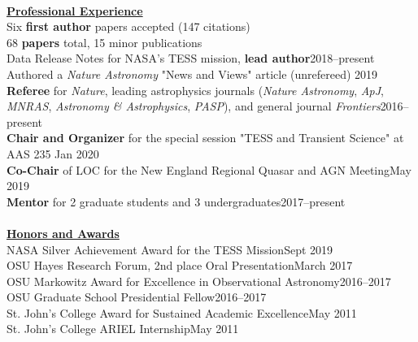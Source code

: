 \documentclass[letterpaper,11pt]{article}
\newcommand{\award}[2]{#1\hfill#2}
\begin{document}
\\
\noindent\underline{\textbf{Professional Experience}}\\ 
 Six \textbf{first author} papers accepted (147 citations) \\
 68 \textbf{papers} total,  15 minor publications\\ %
 Data Release Notes for NASA's TESS mission, \textbf{lead author}\hfill 2018--present\\
Authored a \textit{Nature Astronomy} "News and Views" article (unrefereed) \hfill 2019\\
\textbf{Referee} for \textit{Nature}, leading astrophysics journals (\textit{Nature Astronomy}, \textit{ApJ},\\ 
\indent \textit{MNRAS}, \textit{Astronomy \& Astrophysics}, \textit{PASP}), and
   general journal \textit{Frontiers}\hfill 2016--present\\%
 \textbf{Chair and Organizer} for the special session "TESS and Transient Science" at  AAS 235 \hfill Jan 2020\\
  \textbf{Co-Chair} of LOC for the New England Regional Quasar and AGN Meeting\hfill May 2019\\
   \textbf{Mentor} for 2 graduate students and 3 undergraduates\hfill 2017--present\\
\\
\noindent\underline{\textbf{Honors and Awards}}\\
\award{NASA Silver Achievement Award for the TESS Mission}{Sept 2019}\\
\award{OSU Hayes Research Forum, 2nd place Oral Presentation}{March 2017} \\
\award{OSU Markowitz Award for Excellence in Observational Astronomy}{2016--2017}\\
\award{OSU Graduate School Presidential Fellow}{2016--2017}\\
\award{St. John's College Award for Sustained Academic Excellence}{May 2011}\\
\award{St. John's College ARIEL Internship}{May 2011}\\
\\
\end{document}
